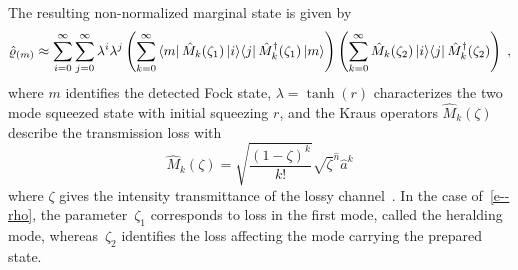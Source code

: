 \documentclass{article}
\begin{document}
The resulting non-normalized marginal state is given by
%
\begin{equation}\label{e--rho}
  \hatrho_{(m)} \approx
  \sum_{i = 0}^{\infty} 
  \sum_{j = 0}^{\infty}
    \lambda^{i} \lambda^{j}
    \left(
      \sum_{k = 0}^{\infty}
        \bra{m} \hat{M}_{k} (\zeta_{1}) \ketbra{i}{j} \hat{M}_{k}^{\dagger} (\zeta_{1}) \ket{m}
    \right)
    \left(
      \sum_{k = 0}^{\infty}
        \hat{M}_{k}(\zeta_{2}) \ketbra{i}{j} \hat{M}_{k}^{\dagger} (\zeta_{2})
    \right) \Qc
\end{equation}
%
where $m$ identifies the detected Fock state, $\lambda = \tanh(r)$ characterizes the two mode squeezed state with initial squeezing $r$, and the Kraus operators $\hat{M}_{k} (\zeta) $ describe the transmission loss with
%
\begin{equation}
  \hat{M}_{k} (\zeta) =
    \sqrt{ \frac{(1 - \zeta)^{k}}{k!} } 
    \sqrt{\zeta}^{\hat{n}} \hat{a}^{k}
\end{equation}
%
where $\zeta$ gives the intensity transmittance of the lossy channel~\cite{ivan2011}. In the case of~\eqref{e--rho}, the parameter~$\zeta_{1}$ corresponds to loss in the first mode, called the heralding mode, whereas~$\zeta_{2}$ identifies the loss affecting the mode carrying the prepared state.
\end{document}

